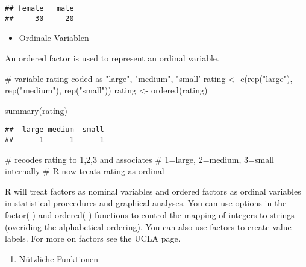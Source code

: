 \documentclass[]{article}
\newenvironment{Shaded}{\begin{snugshade}}{\end{snugshade}}
\newcommand{\KeywordTok}[1]{\textcolor[rgb]{0.94,0.87,0.69}{{#1}}}
\newcommand{\StringTok}[1]{\textcolor[rgb]{0.80,0.58,0.58}{{#1}}}
\newcommand{\CommentTok}[1]{\textcolor[rgb]{0.50,0.62,0.50}{{#1}}}
\newcommand{\NormalTok}[1]{\textcolor[rgb]{0.80,0.80,0.80}{{#1}}}
\begin{document}
\begin{verbatim}
## female   male 
##     30     20
\end{verbatim}

\begin{itemize}
\itemsep1pt\parskip0pt
\item
  Ordinale Variablen
\end{itemize}

An ordered factor is used to represent an ordinal variable.

\begin{Shaded}
\begin{Highlighting}[]
\CommentTok{# variable rating coded as "large", "medium", "small'}
\NormalTok{rating <-}\StringTok{ }\KeywordTok{c}\NormalTok{(}\KeywordTok{rep}\NormalTok{(}\StringTok{"large"}\NormalTok{), }\KeywordTok{rep}\NormalTok{(}\StringTok{"medium"}\NormalTok{), }\KeywordTok{rep}\NormalTok{(}\StringTok{"small"}\NormalTok{))}
\NormalTok{rating <-}\StringTok{ }\KeywordTok{ordered}\NormalTok{(rating)}

\KeywordTok{summary}\NormalTok{(rating)}
\end{Highlighting}
\end{Shaded}

\begin{verbatim}
##  large medium  small 
##      1      1      1
\end{verbatim}

\begin{Shaded}
\begin{Highlighting}[]
\CommentTok{# recodes rating to 1,2,3 and associates}
\CommentTok{# 1=large, 2=medium, 3=small internally}
\CommentTok{# R now treats rating as ordinal}
\end{Highlighting}
\end{Shaded}

R will treat factors as nominal variables and ordered factors as ordinal
variables in statistical proceedures and graphical analyses. You can use
options in the factor( ) and ordered( ) functions to control the mapping
of integers to strings (overiding the alphabetical ordering). You can
also use factors to create value labels. For more on factors see the
UCLA page.

\begin{enumerate}
\def\labelenumi{\arabic{enumi}.}
\setcounter{enumi}{6}
\itemsep1pt\parskip0pt
\item
  Nützliche Funktionen
\end{enumerate}
\end{document}
